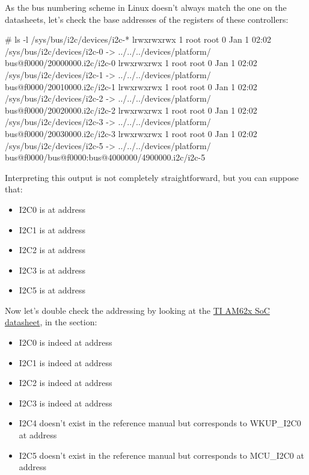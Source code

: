 As the bus numbering scheme in Linux doesn't always match the one
on the datasheets, let's check the base addresses of the registers
of these controllers:

\begin{bashinput}
# ls -l /sys/bus/i2c/devices/i2c-*
lrwxrwxrwx 1 root root 0 Jan 1 02:02 /sys/bus/i2c/devices/i2c-0 -> ../../../devices/platform/
bus@f0000/20000000.i2c/i2c-0
lrwxrwxrwx 1 root root 0 Jan 1 02:02 /sys/bus/i2c/devices/i2c-1 -> ../../../devices/platform/
bus@f0000/20010000.i2c/i2c-1
lrwxrwxrwx 1 root root 0 Jan 1 02:02 /sys/bus/i2c/devices/i2c-2 -> ../../../devices/platform/
bus@f0000/20020000.i2c/i2c-2
lrwxrwxrwx 1 root root 0 Jan 1 02:02 /sys/bus/i2c/devices/i2c-3 -> ../../../devices/platform/
bus@f0000/20030000.i2c/i2c-3
lrwxrwxrwx 1 root root 0 Jan 1 02:02 /sys/bus/i2c/devices/i2c-5 -> ../../../devices/platform/
bus@f0000/bus@f0000:bus@4000000/4900000.i2c/i2c-5
\end{bashinput}

Interpreting this output is not completely straightforward, but you can suppose
that:

\begin{itemize}
\item I2C0 is at address 
\item I2C1 is at address 
\item I2C2 is at address 
\item I2C3 is at address 
\item I2C5 is at address 
\end{itemize}

Now let's double check the addressing by looking at the
\href{https://www.ti.com/lit/ug/spruiv7a/spruiv7a.pdf}{TI AM62x SoC
datasheet}, in the  section:

\begin{itemize}
\item I2C0 is indeed at address 
\item I2C1 is indeed at address 
\item I2C2 is indeed at address 
\item I2C3 is indeed at address 
\item I2C4 doesn't exist in the reference manual but corresponds to
      WKUP\_I2C0 at address 
\item I2C5 doesn't exist in the reference manual but corresponds to
      MCU\_I2C0 at address 
\end{itemize}


